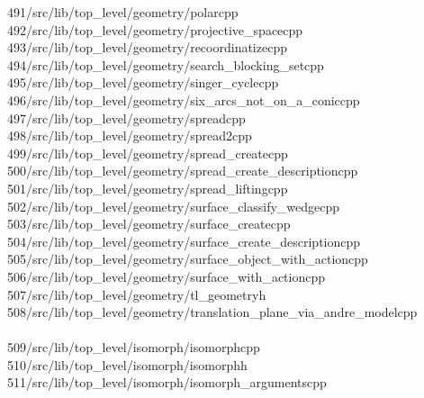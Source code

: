 \begin{tabbing}
491\>/src/lib/top\_level/geometry/polarcpp\\[0pt]
492\>/src/lib/top\_level/geometry/projective\_spacecpp\\[0pt]
493\>/src/lib/top\_level/geometry/recoordinatizecpp\\[0pt]
494\>/src/lib/top\_level/geometry/search\_blocking\_setcpp\\[0pt]
495\>/src/lib/top\_level/geometry/singer\_cyclecpp\\[0pt]
496\>/src/lib/top\_level/geometry/six\_arcs\_not\_on\_a\_coniccpp\\[0pt]
497\>/src/lib/top\_level/geometry/spreadcpp\\[0pt]
498\>/src/lib/top\_level/geometry/spread2cpp\\[0pt]
499\>/src/lib/top\_level/geometry/spread\_createcpp\\[0pt]
500\>/src/lib/top\_level/geometry/spread\_create\_descriptioncpp\\[0pt]
501\>/src/lib/top\_level/geometry/spread\_liftingcpp\\[0pt]
502\>/src/lib/top\_level/geometry/surface\_classify\_wedgecpp\\[0pt]
503\>/src/lib/top\_level/geometry/surface\_createcpp\\[0pt]
504\>/src/lib/top\_level/geometry/surface\_create\_descriptioncpp\\[0pt]
505\>/src/lib/top\_level/geometry/surface\_object\_with\_actioncpp\\[0pt]
506\>/src/lib/top\_level/geometry/surface\_with\_actioncpp\\[0pt]
507\>/src/lib/top\_level/geometry/tl\_geometryh\\[0pt]
508\>/src/lib/top\_level/geometry/translation\_plane\_via\_andre\_modelcpp\\[0pt]
\>\\[0pt]
509\>/src/lib/top\_level/isomorph/isomorphcpp\\[0pt]
510\>/src/lib/top\_level/isomorph/isomorphh\\[0pt]
511\>/src/lib/top\_level/isomorph/isomorph\_argumentscpp\\[0pt]

\end{tabbing}
